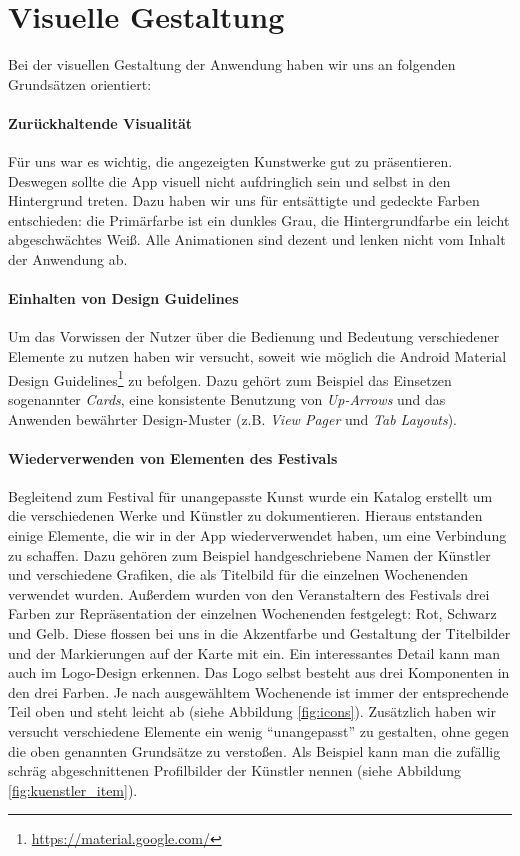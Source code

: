 \section{Visuelle Gestaltung}
\label{sec:visual}
Bei der visuellen Gestaltung der Anwendung haben wir uns an folgenden Grundsätzen orientiert:
\paragraph{Zurückhaltende Visualität}Für uns war es wichtig, die angezeigten Kunstwerke gut zu präsentieren. Deswegen sollte die App visuell nicht aufdringlich sein und selbst in den Hintergrund treten. Dazu haben wir uns für entsättigte und gedeckte Farben entschieden: die Primärfarbe ist ein dunkles Grau, die Hintergrundfarbe ein leicht abgeschwächtes Weiß. Alle Animationen sind dezent und lenken nicht vom Inhalt der Anwendung ab.
\paragraph{Einhalten von Design Guidelines} Um das Vorwissen der Nutzer über die Bedienung und Bedeutung verschiedener Elemente zu nutzen haben wir versucht, soweit wie möglich die Android Material Design Guidelines\footnote{\url{https://material.google.com/}} zu befolgen. Dazu gehört zum Beispiel das Einsetzen sogenannter \textit{Cards}, eine konsistente Benutzung von \textit{Up-Arrows} und das Anwenden bewährter Design-Muster (z.B. \textit{View Pager} und \textit{Tab Layouts}).
\paragraph{Wiederverwenden von Elementen des Festivals}\label{section_visual_elements} Begleitend zum Festival für unangepasste Kunst wurde ein Katalog erstellt um die verschiedenen Werke und Künstler zu dokumentieren. Hieraus entstanden einige Elemente, die wir in der App wiederverwendet haben, um eine Verbindung zu schaffen. Dazu gehören zum Beispiel handgeschriebene Namen der Künstler und verschiedene Grafiken, die als Titelbild für die einzelnen Wochenenden verwendet wurden. Außerdem wurden von den Veranstaltern des Festivals drei Farben zur Repräsentation der einzelnen Wochenenden festgelegt: Rot, Schwarz und Gelb. Diese flossen bei uns in die Akzentfarbe und Gestaltung der Titelbilder und der Markierungen auf der Karte mit ein. Ein interessantes Detail kann man auch im Logo-Design erkennen. Das Logo selbst besteht aus drei Komponenten in den drei Farben. Je nach ausgewähltem Wochenende ist immer der entsprechende Teil oben und steht leicht ab (siehe Abbildung \ref{fig:icons}).
Zusätzlich haben wir versucht verschiedene Elemente ein wenig "`unangepasst"' zu gestalten, ohne gegen die oben genannten Grundsätze zu verstoßen. Als Beispiel kann man die zufällig schräg abgeschnittenen Profilbilder der Künstler nennen (siehe Abbildung \ref{fig:kuenstler_item}).


